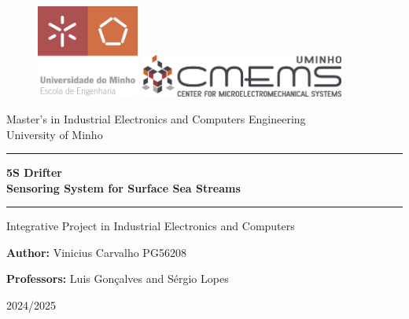 \centering
\begin{figure}[h!]  %
    \centering
    \includegraphics[width=0.3\textwidth]{images/logos/ENG-EN.png}  %
    \label{fig:UM logo}
    \hspace{0.1cm}
    \includegraphics[width=0.6\textwidth]{images/logos/CMEMS.png}  %
    \label{fig:CMEMS logo}
    

\end{figure}
\vspace{0.25in}
\large
Master’s in Industrial Electronics and Computers Engineering \\
\vspace{0.15in}
\LARGE
University of Minho\\
\vspace{0.35in}
\hrule

\vspace{0.2in}
\textbf{\Huge 5S Drifter \\ \Large Sensoring System for Surface Sea Streams}
\vspace{0.2in}

\hrule
\vspace{0.2in}
\large
Integrative Project in Industrial Electronics and Computers
\vspace{4in}

\textbf{Author:}
Vinicius Carvalho PG56208

\vspace{0.1in}

\textbf{Professors:}
Luis Gonçalves and
Sérgio Lopes

\vfill

2024/2025